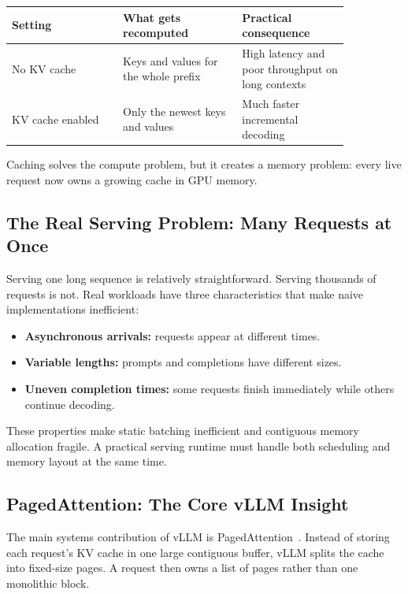 \documentclass[class=article,crop=false]{standalone}
\begin{document}
\begin{center}
\small
\begin{tabular}{p{0.28\linewidth} p{0.30\linewidth} p{0.27\linewidth}}
\toprule
Setting & What gets recomputed & Practical consequence \\
\midrule
No KV cache & Keys and values for the whole prefix & High latency and poor throughput on long contexts \\
KV cache enabled & Only the newest keys and values & Much faster incremental decoding \\
\bottomrule
\end{tabular}
\end{center}

Caching solves the compute problem, but it creates a memory problem: every live request now owns a growing cache in GPU memory.

\subsection{The Real Serving Problem: Many Requests at Once}
\label{sec:vllm:serving}

Serving one long sequence is relatively straightforward. Serving thousands of requests is not. Real workloads have three characteristics that make naive implementations inefficient:
\begin{itemize}
  \item \textbf{Asynchronous arrivals:} requests appear at different times.
  \item \textbf{Variable lengths:} prompts and completions have different sizes.
  \item \textbf{Uneven completion times:} some requests finish immediately while others continue decoding.
\end{itemize}

These properties make static batching inefficient and contiguous memory allocation fragile. A practical serving runtime must handle both scheduling and memory layout at the same time.

\subsection{PagedAttention: The Core vLLM Insight}
\label{sec:vllm:paged}

The main systems contribution of vLLM is PagedAttention~\cite{kwon2023efficient}. Instead of storing each request's KV cache in one large contiguous buffer, vLLM splits the cache into fixed-size pages. A request then owns a list of pages rather than one monolithic block.
\end{document}
